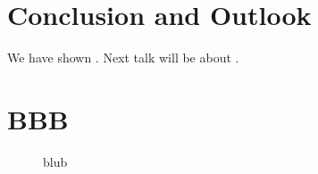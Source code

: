 \documentclass[a4paper,11pt, BCOR=4mm, DIV=12, pagesize]{scrartcl}
\begin{document}
\section{Conclusion and Outlook}
We have shown \todo. Next talk will be about \todo.

\newpage
\section{BBB}
\cite{hansbla}
\begin{figure}[ht]
 \caption[short random description]{blub} 
 \label{fig:42}
\end{figure}





\begin{spacing}{1}
{}

\listoffigures
\end{spacing}
\end{document}
